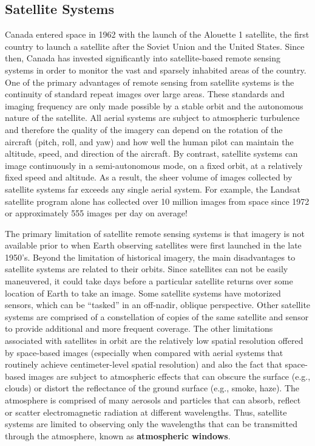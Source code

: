 \documentclass[
]{book}
\begin{document}
\subsection{Satellite Systems}\label{satellite-systems}

Canada entered space in 1962 with the launch of the Alouette 1 satellite, the first country to launch a satellite after the Soviet Union and the United States. Since then, Canada has invested significantly into satellite-based remote sensing systems in order to monitor the vast and sparsely inhabited areas of the country. One of the primary advantages of remote sensing from satellite systems is the continuity of standard repeat images over large areas. These standards and imaging frequency are only made possible by a stable orbit and the autonomous nature of the satellite. All aerial systems are subject to atmospheric turbulence and therefore the quality of the imagery can depend on the rotation of the aircraft (pitch, roll, and yaw) and how well the human pilot can maintain the altitude, speed, and direction of the aircraft. By contrast, satellite systems can image continuously in a semi-autonomous mode, on a fixed orbit, at a relatively fixed speed and altitude. As a result, the sheer volume of images collected by satellite systems far exceeds any single aerial system. For example, the Landsat satellite program alone has collected over 10 million images from space since 1972 or approximately 555 images per day on average!

The primary limitation of satellite remote sensing systems is that imagery is not available prior to when Earth observing satellites were first launched in the late 1950's. Beyond the limitation of historical imagery, the main disadvantages to satellite systems are related to their orbits. Since satellites can not be easily maneuvered, it could take days before a particular satellite returns over some location of Earth to take an image. Some satellite systems have motorized sensors, which can be ``tasked'' in an off-nadir, oblique perspective. Other satellite systems are comprised of a constellation of copies of the same satellite and sensor to provide additional and more frequent coverage. The other limitations associated with satellites in orbit are the relatively low spatial resolution offered by space-based images (especially when compared with aerial systems that routinely achieve centimeter-level spatial resolution) and also the fact that space-based images are subject to atmospheric effects that can obscure the surface (e.g., clouds) or distort the reflectance of the ground surface (e.g., smoke, haze). The atmosphere is comprised of many aerosols and particles that can absorb, reflect or scatter electromagnetic radiation at different wavelengths. Thus, satellite systems are limited to observing only the wavelengths that can be transmitted through the atmosphere, known as \textbf{atmospheric windows}.
\end{document}
